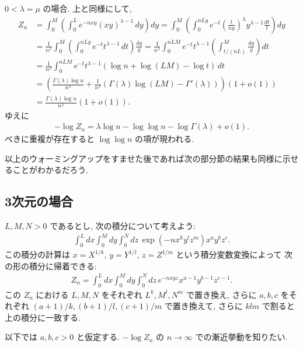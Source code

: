\documentclass[12pt,twoside]{jarticle}
\theoremstyle{jplain}
\theoremstyle{jplain}
\theoremstyle{jplain}
\numberwithin{theorem}{section}
\numberwithin{equation}{section}
\numberwithin{figure}{section}
\numberwithin{table}{section}
\begin{document}
$0<\lambda=\mu$ の場合. 上と同様にして,
\begin{align*}
Z_n
&=\int_0^M \left(\int_0^L e^{-nxy} (xy)^{\lambda-1}\,dy\right)dy
=\int_0^M \left(\int_0^{nLy} e^{-t} \left(\frac{t}{ny}\right)^\lambda y^{\lambda-1}\frac{dt}{t}\right)dy
\\ &
=\frac{1}{n^\lambda}\int_0^M \left(\int_0^{nLy} e^{-t} t^{\lambda-1}\,dt\right)\frac{dy}{y}
=\frac{1}{n^\lambda}\int_0^{nLM} e^{-t} t^{\lambda-1} \left(\int_{t/(nL)}^{M}\frac{dy}{y}\right)dt
\\ &
=\frac{1}{n^\lambda}\int_0^{nLM} e^{-t} t^{\lambda-1}
\left(\log n + \log(LM) -\log t \right)\,dt
\\ &
=\left(
\frac{\Gamma(\lambda)\log n}{n^\lambda}
+\frac{1}{n^\lambda}
\left(\Gamma(\lambda)\log(LM)-\Gamma'(\lambda)\right)
\right)(1+o(1))
\\ &
=\frac{\Gamma(\lambda)\log n}{n^\lambda}(1+o(1)).
\end{align*}
ゆえに
\begin{align*}
-\log Z_n = \lambda\log n - \log\log n -\log\Gamma(\lambda)+o(1).
\end{align*}
べきに重複が存在すると $\log\log n$ の項が現われる.

以上のウォーミングアップをすませた後であれば次の部分節の結果も同様に示せることがわかるだろう.


\subsection{3次元の場合}
\label{sec:d=3}

$L,M,N>0$ であるとし, 次の積分について考えよう:
\begin{align*}
\int_0^L dx\int_0^M dy\int_0^N dz\, \exp\left(-n x^k y^l z^m \right) x^a y^b z^c.
\end{align*}
この積分の計算は $x=X^{1/k}$, $y=Y^{1/l}$, $z=Z^{1/m}$ という積分変数変換によって
次の形の積分に帰着できる:
\begin{align*}
Z_n = \int_0^L dx \int_0^M dy \int_0^N dz\,
e^{-nxyz}x^{a-1}y^{b-1}z^{c-1}.
\end{align*}
この $Z_n$ における $L,M,N$ をそれぞれ $L^k,M^l,N^m$ で置き換え,
さらに $a,b,c$ をそれぞれ $(a+1)/k, (b+1)/l, (c+1)/m$ で置き換えて,
さらに $klm$ で割ると上の積分に一致する.

以下では $a,b,c>0$ と仮定する.  $-\log Z_n$ の $n\to\infty$ での漸近挙動を知りたい.
\end{document}
